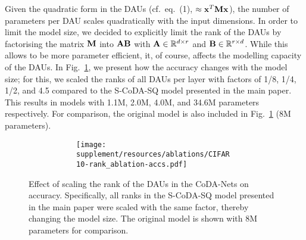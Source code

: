 Given the quadratic form in the DAUs (cf.~eq.~(1), $\approx \vec x^T\mat M \vec x$), the number of parameters per DAU scales quadratically with the input dimensions. In order to limit the model size, we decided to explicitly limit the rank of the DAUs by factorising the matrix $\mat M$ into $\mat a\mat b$ with $\mat a\in\mathbb{R}^{d\times r}$ and $\mat b\in\mathbb{R}^{r\times d}$.
While this allows to be more parameter efficient, it, of course, affects the modelling capacity of the DAUs. In Fig.~\ref{fig:R_ablation}, we present how the accuracy changes with the model size; for this, we scaled the ranks of all DAUs per layer with factors of 1/8, 1/4, 1/2, and 4.5 compared to the S-CoDA-SQ model presented in the main paper. This results in models with 1.1M, 2.0M, 4.0M, and 34.6M parameters respectively. For comparison, the original model is also included in Fig.~\ref{fig:R_ablation} (8M parameters).
\begin{figure}
\centering
    \begin{subfigure}[c]{\textwidth}
    \centering
    \begin{subfigure}[c]{0.45\textwidth}
    \centering
    \texttt{[image: supplement/resources/ablations/CIFAR10-rank\_ablation-accs.pdf]}
    \end{subfigure}
    \vspace{.75em}
    \end{subfigure}
    \caption{Effect of scaling the rank of the DAUs in the CoDA-Nets on accuracy. Specifically, all ranks in the S-CoDA-SQ model presented in the main paper were scaled with the same factor, thereby changing the model size. The original model is shown with 8M parameters for comparison.}
    \label{fig:R_ablation}
\end{figure}


